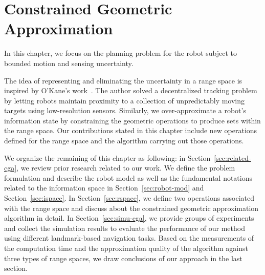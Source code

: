 \chapter{Constrained Geometric Approximation}
\label{chp:cga}

In this chapter, we focus on the planning problem for the robot subject to bounded
motion and sensing uncertainty.

The idea of representing and eliminating the uncertainty in a range space is inspired by O'Kane's
work~\cite{OKa11}. The author solved a decentralized tracking problem by letting
robots maintain proximity to a collection of unpredictably moving targets using
low-resolution sensors. Similarly, we over-approximate a robot's information state 
by constraining the geometric operations to produce sets within the range space. 
Our contributions stated in this chapter include new operations defined for the range space 
and the algorithm carrying out those operations. 

We organize the remaining of this chapter as following: in Section~\ref{sec:related-cga}, 
we review prior research related to our work. 
%
We define the problem formulation and describe the robot model as well as the
fundamental notations related to the information space in Section~\ref{sec:robot-mod} and Section~\ref{sec:ispace}. 
In Section~\ref{sec:rspace}, we define two operations
associated with the range space and discuss about the constrained geometric
approximation algorithm in detail. In Section~\ref{sec:simu-cga}, we provide groups of
experiments and collect the simulation results to evaluate the performance of our method
using different landmark-based navigation tasks. 
Based on the measurements of the computation time and the approximation quality of the algorithm
against three types of range spaces, we draw conclusions of our approach in the last section.

